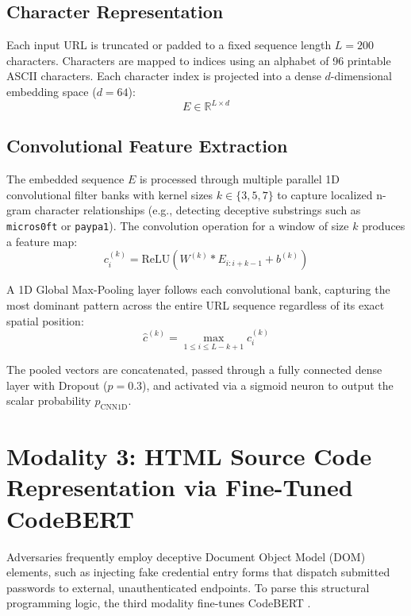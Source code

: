 \subsection{Character Representation}
Each input URL is truncated or padded to a fixed sequence length $L = 200$ characters. Characters are mapped to indices using an alphabet of 96 printable ASCII characters. Each character index is projected into a dense $d$-dimensional embedding space ($d = 64$):
\begin{equation}
E \in \mathbb{R}^{L \times d}
\label{eq:embed}
\end{equation}

\subsection{Convolutional Feature Extraction}
The embedded sequence $E$ is processed through multiple parallel 1D convolutional filter banks with kernel sizes $k \in \{3, 5, 7\}$ to capture localized n-gram character relationships (e.g., detecting deceptive substrings such as \texttt{micros0ft} or \texttt{paypa1}). The convolution operation for a window of size $k$ produces a feature map:
\begin{equation}
c_i^{(k)} = \text{ReLU}\left(W^{(k)} * E_{i:i+k-1} + b^{(k)}\right)
\label{eq:conv}
\end{equation}

A 1D Global Max-Pooling layer follows each convolutional bank, capturing the most dominant pattern across the entire URL sequence regardless of its exact spatial position:
\begin{equation}
\hat{c}^{(k)} = \max_{1 \le i \le L-k+1} c_i^{(k)}
\label{eq:pool}
\end{equation}

The pooled vectors are concatenated, passed through a fully connected dense layer with Dropout ($p = 0.3$), and activated via a sigmoid neuron to output the scalar probability $p_{\text{CNN1D}}$.

\section{Modality 3: HTML Source Code Representation via Fine-Tuned CodeBERT}
Adversaries frequently employ deceptive Document Object Model (DOM) elements, such as injecting fake credential entry forms that dispatch submitted passwords to external, unauthenticated endpoints. To parse this structural programming logic, the third modality fine-tunes CodeBERT \cite{6}.

